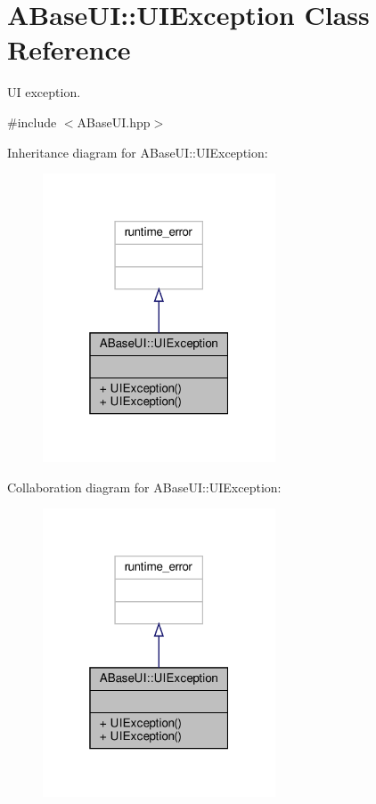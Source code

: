 \hypertarget{class_a_base_u_i_1_1_u_i_exception}{}\section{A\+Base\+UI\+:\+:U\+I\+Exception Class Reference}
\label{class_a_base_u_i_1_1_u_i_exception}


UI exception.  




{\ttfamily \#include $<$A\+Base\+U\+I.\+hpp$>$}



Inheritance diagram for A\+Base\+UI\+:\+:U\+I\+Exception\+:
\nopagebreak
\begin{figure}[H]
\begin{center}
\leavevmode
\includegraphics[width=196pt]{class_a_base_u_i_1_1_u_i_exception__inherit__graph}
\end{center}
\end{figure}


Collaboration diagram for A\+Base\+UI\+:\+:U\+I\+Exception\+:
\nopagebreak
\begin{figure}[H]
\begin{center}
\leavevmode
\includegraphics[width=196pt]{class_a_base_u_i_1_1_u_i_exception__coll__graph}
\end{center}
\end{figure}
